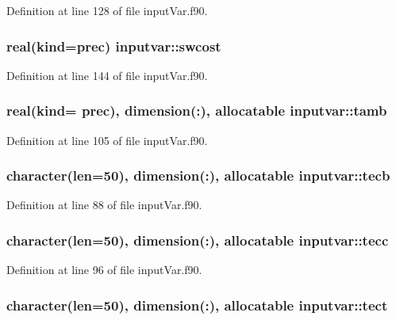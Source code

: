 Definition at line 128 of file input\-Var.\-f90.

\hypertarget{classinputvar_aa9cd3592e06c1cfdc7fee2caf5b13d1f}{
\subsubsection[{swcost}]{\setlength{\rightskip}{0pt plus 5cm}real(kind=prec) inputvar\-::swcost}}\label{classinputvar_aa9cd3592e06c1cfdc7fee2caf5b13d1f}


Definition at line 144 of file input\-Var.\-f90.

\hypertarget{classinputvar_a1cdc501a6b8cb511ab141219362b9aaa}{
\subsubsection[{tamb}]{\setlength{\rightskip}{0pt plus 5cm}real(kind= prec), dimension(\-:), allocatable inputvar\-::tamb}}\label{classinputvar_a1cdc501a6b8cb511ab141219362b9aaa}


Definition at line 105 of file input\-Var.\-f90.

\hypertarget{classinputvar_ab2486a625a1ff1aaf70cb9e38d8c07db}{
\subsubsection[{tecb}]{\setlength{\rightskip}{0pt plus 5cm}character(len=50), dimension(\-:), allocatable inputvar\-::tecb}}\label{classinputvar_ab2486a625a1ff1aaf70cb9e38d8c07db}


Definition at line 88 of file input\-Var.\-f90.

\hypertarget{classinputvar_a2eb1c20cfae159c006e0fdc4b9ef0ef0}{
\subsubsection[{tecc}]{\setlength{\rightskip}{0pt plus 5cm}character(len=50), dimension(\-:), allocatable inputvar\-::tecc}}\label{classinputvar_a2eb1c20cfae159c006e0fdc4b9ef0ef0}


Definition at line 96 of file input\-Var.\-f90.

\hypertarget{classinputvar_afb7d5163d753c7bbd2c1505e8ee68197}{
\subsubsection[{tect}]{\setlength{\rightskip}{0pt plus 5cm}character(len=50), dimension(\-:), allocatable inputvar\-::tect}}\label{classinputvar_afb7d5163d753c7bbd2c1505e8ee68197}


